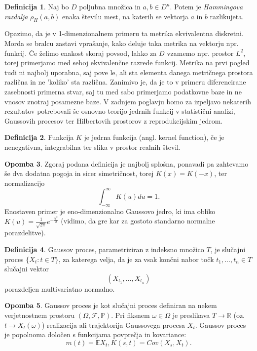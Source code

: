 \documentclass[12pt,a4paper]{amsart}
\theoremstyle{definition} %
\newtheorem{definicija}{Definicija}[section]
\newtheorem{opomba}[definicija]{Opomba}
\theoremstyle{plain} %
\begin{document}
\begin{definicija}
Naj bo $D$ poljubna množica in $a , b \in D^n$. Potem je  \textit{Hammingova razdalja} $\rho_H(a,b)$ enaka številu mest, na katerih se vektorja $a$ in $b$ razlikujeta.
\end{definicija}
Opazimo, da je v 1-dimenzionalnem primeru  ta metrika ekvivalentna diskretni. Morda se bralcu zastavi vprašanje, kako deluje taka metrika na vektorju npr. funkcij. Če želimo enakost skoraj povsod, lahko za $D$ vzamemo npr. prostor $L^2$, torej primerjamo med seboj ekvivalenčne razrede funkcij.  Metrika na prvi pogled tudi ni najbolj uporabna, saj pove le, ali sta elementa danega metričnega prostora različna in ne 'koliko' sta različna. Zanimivo je, da je to v primeru diferencirane zasebnosti primerna stvar, saj tu med sabo primerjamo podatkovne baze in ne vnosov znotraj posamezne baze. 
\newline
\newline
V zadnjem poglavju bomo za izpeljavo nekaterih rezultatov potrebovali še osnovno teorijo jedrnih funkcij v statistični analizi, Gaussovih procesov ter Hilbertovih prostorov z reprodukcijskim jedrom. 
\begin{definicija}
Funkcija $K$ je jedrna funkcija (angl. kernel function), če je nenegativna, integrabilna ter slika v prostor realnih števil.
\end{definicija}
\begin{opomba}
Zgoraj podana definicija je najbolj splošna, ponavadi pa zahtevamo še dva dodatna pogoja in sicer simetričnost, torej $K(x) = K(-x)$, ter normalizacijo
$$
\int_{-\infty}^{\infty} K(u)du=1.
$$
Enostaven primer je eno-dimenzionalno Gaussovo jedro, ki ima obliko $K(u)=\frac{1}{\sqrt{2\pi}}e^{-\frac{u^2}{2}}$ (vidimo, da gre kar za gostoto standarno normalne porazdelitve).
\end{opomba}
\begin{definicija}
Gaussov proces, parametriziran z indeksno množico $T$, je slučajni proces $\{X_t : t \in T\}$, za katerega velja, da je za vsak končni nabor točk $t_1,...,t_n \in T$ slučajni vektor
$$
(X_{t_1},...,X_{t_n})
$$
porazdeljen multivariatno normalno.
\end{definicija}
\begin{opomba}
Gaussov proces je kot slučajni proces definiran na nekem verjetnostnem prostoru  $(\Omega, \mathcal{F}, \mathbb{P})$. Pri fiksnem $\omega \in \Omega$ je preslikava $T \rightarrow \mathbb{R}$ (oz. $t \rightarrow X_t(\omega)$) realizacija ali trajektorija Gaussovega procesa $X_t$. Gaussov proces je popolnoma določen s funkcijama povprečja  in kovariance: 
$$m(t) = \mathbb{E}X_t, K(s,t) = Cov(X_s,X_t).$$
\end{opomba}
\end{document}
